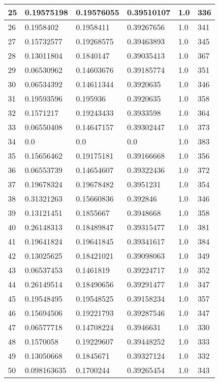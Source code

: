 \begin{longtable}{|l|l|l|l|l|l|}
25 & 0.19575198 & 0.19576055 & 0.39510107 & 1.0 & 336 \\ \hline 
26 & 0.1958402 & 0.1958411 & 0.39267656 & 1.0 & 341 \\ \hline 
27 & 0.15732577 & 0.19268575 & 0.39463893 & 1.0 & 345 \\ \hline 
28 & 0.13011804 & 0.1840147 & 0.39035413 & 1.0 & 367 \\ \hline 
29 & 0.06530962 & 0.14603676 & 0.39185774 & 1.0 & 351 \\ \hline 
30 & 0.06534392 & 0.14611344 & 0.3920635 & 1.0 & 346 \\ \hline 
31 & 0.19593596 & 0.195936 & 0.3920635 & 1.0 & 358 \\ \hline 
32 & 0.1571217 & 0.19243433 & 0.3933598 & 1.0 & 364 \\ \hline 
33 & 0.06550408 & 0.14647157 & 0.39302447 & 1.0 & 373 \\ \hline 
34 & 0.0 & 0.0 & 0.0 & 1.0 & 383 \\ \hline 
35 & 0.15656462 & 0.19175181 & 0.39166668 & 1.0 & 356 \\ \hline 
36 & 0.06553739 & 0.14654607 & 0.39322436 & 1.0 & 372 \\ \hline 
37 & 0.19678324 & 0.19678482 & 0.3951231 & 1.0 & 354 \\ \hline 
38 & 0.31321263 & 0.15660836 & 0.392846 & 1.0 & 346 \\ \hline 
39 & 0.13121451 & 0.1855667 & 0.3948668 & 1.0 & 358 \\ \hline 
40 & 0.26148313 & 0.18489847 & 0.39315477 & 1.0 & 381 \\ \hline 
41 & 0.19641824 & 0.19641845 & 0.39341617 & 1.0 & 384 \\ \hline 
42 & 0.13025625 & 0.18421021 & 0.39098063 & 1.0 & 349 \\ \hline 
43 & 0.06537453 & 0.1461819 & 0.39224717 & 1.0 & 352 \\ \hline 
44 & 0.26149514 & 0.18490656 & 0.39291477 & 1.0 & 347 \\ \hline 
45 & 0.19548495 & 0.19548525 & 0.39158234 & 1.0 & 357 \\ \hline 
46 & 0.15694506 & 0.19221793 & 0.39287546 & 1.0 & 347 \\ \hline 
47 & 0.06577718 & 0.14708224 & 0.3946631 & 1.0 & 330 \\ \hline 
48 & 0.1570058 & 0.19229607 & 0.39448252 & 1.0 & 333 \\ \hline 
49 & 0.13050668 & 0.1845671 & 0.39327124 & 1.0 & 332 \\ \hline 
50 & 0.098163635 & 0.1700244 & 0.39265454 & 1.0 & 343 \\ \hline 
\end{longtable}